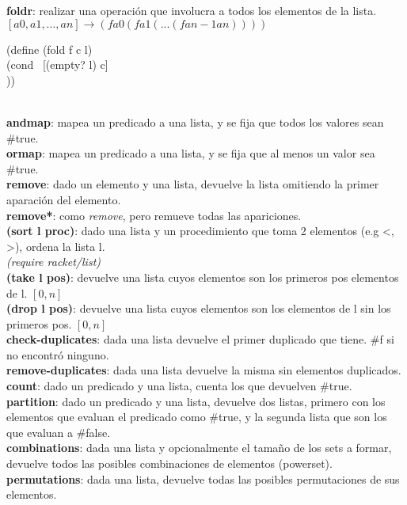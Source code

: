 \documentclass[11pt,a4paper]{article}
\begin{document}
\newpage

\noindent \textbf{foldr}: realizar una operaci\'on que involucra a todos los elementos de la lista. $[a0, a1, ..., an] \rightarrow (f a0 (f a1 (... (f an-1 an))))$
\begin{siderules}
(define (fold f c l)\\
\indent \indent \indent (cond \ [(empty? l) c]\\
\indent \indent \indent \indent {}))
\end{siderules}

\noindent \dotfill\\

\noindent \textbf{andmap}: mapea un predicado a una lista, y se fija que todos los valores sean \#true.\\ 

\noindent \textbf{ormap}: mapea un predicado a una lista, y se fija que al menos un valor sea \#true.\\

\noindent \textbf{remove}: dado un elemento y una lista, devuelve la lista omitiendo la primer aparaci\'on del elemento.\\

\noindent \textbf{remove*}: como \textit{remove}, pero remueve todas las apariciones.\\

\noindent \textbf{(sort l proc)}: dado una lista y un procedimiento que toma 2 elementos (e.g <, >), ordena la lista l.\\

\textit{(require racket/list)}\\

\noindent \textbf{(take l pos)}: devuelve una lista cuyos elementos son los primeros pos elementos de l. $[0,n]$\\

\noindent \textbf{(drop l pos)}: devuelve una lista cuyos elementos son los elementos de l sin los primeros pos. $[0,n]$\\

\noindent \textbf{check-duplicates}: dada una lista devuelve el primer duplicado que tiene. \#f si no encontr\'o ninguno.\\

\noindent \textbf{remove-duplicates}: dada una lista devuelve la misma sin elementos duplicados.\\

\noindent \textbf{count}: dado un predicado y una lista, cuenta los que devuelven \#true.\\

\noindent \textbf{partition}: dado un predicado y una lista, devuelve dos listas, primero con los elementos que evaluan el predicado como \#true, y la segunda lista que son los que evaluan a \#false.\\

\noindent \textbf{combinations}: dada una lista y opcionalmente el tama\~no de los sets a formar, devuelve todos las posibles combinaciones de elementos (powerset).\\

\noindent \textbf{permutations}: dada una lista, devuelve todas las posibles permutaciones de sus elementos.
\end{document}

